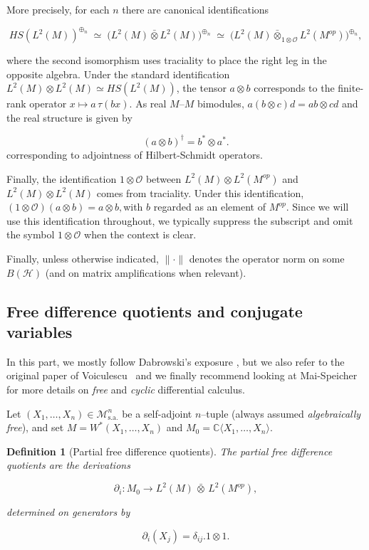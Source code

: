 \documentclass[10pt,a4paper,reqno]{amsart}
\newtheorem{definition}[theorem]{Definition}
\begin{document}
\medskip

More precisely, for each $n$ there are canonical identifications


\[\label{HS}
HS(L^2(M))^{\oplus_n}
\;\simeq\;
\big(L^2(M)\bar\otimes L^2(M)\big)^{\oplus_n}
\;\simeq\;
\big(L^2(M)\bar\otimes_{1\otimes\mathcal{O}} L^2(M^{op})\big)^{\oplus_n},
\]


where the second isomorphism uses traciality to place the right leg in the
opposite algebra.  Under the standard identification
$L^2(M)\otimes L^2(M)\simeq HS(L^2(M))$, the tensor $a\otimes b$ corresponds to
the finite-rank operator $x\mapsto a\,\tau(bx)$.  As real $M$--$M$ bimodules, $a(b\otimes c)d = ab\otimes cd$
and the real structure is given by

\[\label{hs}
(a\otimes b)^\dagger = b^\ast\otimes a^\ast.
\]
corresponding to adjointness of Hilbert-Schmidt operators.


\medskip

Finally, the identification $1\otimes\mathcal{O}$ between
$L^2(M)\otimes L^2(M^{op})$ and $L^2(M)\otimes L^2(M)$ comes from traciality.
Under this identification, $
(1\otimes\mathcal{O})(a\otimes b)=a\otimes b,
$with $b$ regarded as an element of $M^{op}$.  Since we will use this
identification throughout, we typically suppress the subscript and omit the
symbol $1\otimes\mathcal{O}$ when the context is clear.

\medskip

Finally, unless otherwise indicated, $\|\cdot\|$ denotes the operator norm on some
$B(\mathcal{H})$ (and on matrix amplifications when relevant).



\bigskip
\subsection{Free difference quotients and conjugate variables}
In this part, we mostly follow Dabrowski's exposure \cite{Dab10,Dab14}, but we also refer to the original paper of Voiculescu~\cite{V} and we finally recommend looking at Mai-Speicher\cite{MS} for more details on \emph{free} and \emph{cyclic} differential calculus.
\begin{flushleft}
Let $(X_1,\ldots,X_n)\in\mathcal{M}^n_{\mathrm{s.a.}}$ be a self-adjoint
$n$--tuple (always assumed \emph{algebraically free}), and set $M=W^\ast(X_1,\ldots,X_n)$ and
$M_0=\mathbb{C}\langle X_1,\ldots,X_n\rangle$.
\end{flushleft}
\begin{definition}[Partial free difference quotients]
The \emph{partial free difference quotients} are the derivations


\[
\partial_i : M_0 \longrightarrow L^2(M)\,\bar\otimes\,L^2(M^{op}),
\]


determined on generators by


\[
\partial_i(X_j)=\delta_{ij}.1\otimes 1.
\]


\end{definition}
\end{document}
